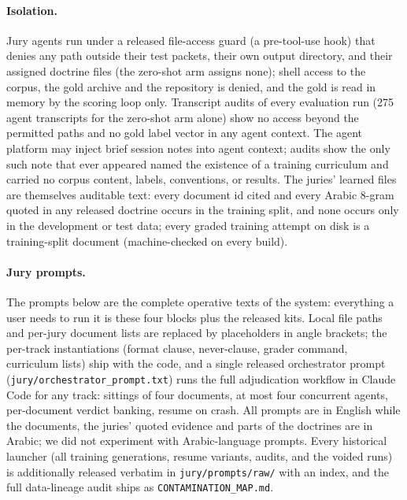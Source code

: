 \documentclass[11pt]{article}
\begin{document}
\paragraph{Isolation.} Jury agents run under a released file-access guard (a
pre-tool-use hook) that denies any path outside their test packets, their own output
directory, and their assigned doctrine files (the zero-shot arm assigns none); shell
access to the corpus, the gold archive and the repository is denied, and the gold is
read in memory by the scoring loop only. Transcript audits of every evaluation run
(275 agent transcripts for the zero-shot arm alone) show no access beyond the permitted
paths and no gold label vector in any agent context. The agent platform may inject
brief session notes into agent context; audits show the only such note that ever
appeared named the existence of a training curriculum and carried no corpus content,
labels, conventions, or results. The juries' learned files are themselves auditable text: every document id cited and every Arabic 8-gram quoted in any released doctrine occurs in the training split, and none occurs only in the development or test data; every graded training attempt on disk is a training-split document (machine-checked on every build).
\paragraph{Jury prompts.} The prompts below are the complete operative texts of the
system: everything a user needs to run it is these four blocks plus the released
kits. Local file paths and per-jury document lists are replaced by placeholders in
angle brackets; the per-track instantiations (format clause, never-clause, grader
command, curriculum lists) ship with the code, and a single released orchestrator
prompt (\texttt{jury/orchestrator\_prompt.txt}) runs the full adjudication workflow
in Claude Code for any track: sittings of four documents, at most four concurrent
agents, per-document verdict banking, resume on crash. All prompts are in English
while the documents, the juries' quoted evidence and parts of the doctrines are in
Arabic; we did not experiment with Arabic-language prompts. Every historical
launcher (all training generations, resume variants, audits, and the voided runs)
is additionally released verbatim in \texttt{jury/prompts/raw/} with an index, and
the full data-lineage audit ships as \texttt{CONTAMINATION\_MAP.md}.
\end{document}
